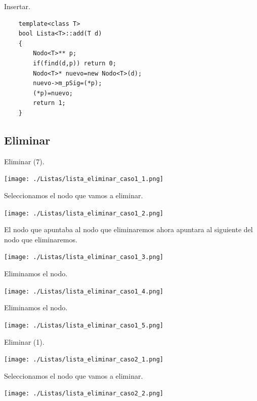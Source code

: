 \documentclass{beamer}
\begin{document}
\begin{frame}[fragile]
  Insertar.
  \begin{verbatim}
    template<class T>
    bool Lista<T>::add(T d)
    {
        Nodo<T>** p;
        if(find(d,p)) return 0;
        Nodo<T>* nuevo=new Nodo<T>(d);
        nuevo->m_pSig=(*p);
        (*p)=nuevo;
        return 1;
    }

  \end{verbatim}
\end{frame}





\subsection{Eliminar}

\begin{frame}
  Eliminar (7).
  
  \texttt{[image: ./Listas/lista\_eliminar\_caso1\_1.png]}
\end{frame}


\begin{frame}
  Seleccionamos el nodo que vamos a eliminar.
  
  \texttt{[image: ./Listas/lista\_eliminar\_caso1\_2.png]}
\end{frame}

\begin{frame}
  El nodo que apuntaba al nodo que eliminaremos ahora apuntara al siguiente del nodo que eliminaremos.
  
  \texttt{[image: ./Listas/lista\_eliminar\_caso1\_3.png]}
\end{frame}

\begin{frame}
  Eliminamos el nodo.
  
  \texttt{[image: ./Listas/lista\_eliminar\_caso1\_4.png]}
\end{frame}

\begin{frame}
  Eliminamos el nodo.
  
  \texttt{[image: ./Listas/lista\_eliminar\_caso1\_5.png]}
\end{frame}


\begin{frame}
  Eliminar (1).
  
  \texttt{[image: ./Listas/lista\_eliminar\_caso2\_1.png]}
\end{frame}


\begin{frame}
  Seleccionamos el nodo que vamos a eliminar.
  
  \texttt{[image: ./Listas/lista\_eliminar\_caso2\_2.png]}
\end{frame}
\end{document}
